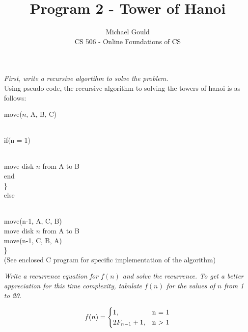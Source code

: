 \documentclass[10pt]{article}
\newcommand\tab[1][1cm]{\hspace*{#1}}
\begin{document}
\title{Program 2 - Tower of Hanoi}
\author{Michael Gould\\ 
CS 506 - Online Foundations of CS}

\maketitle
\textit{First, write a recursive algortihm to solve the problem.}\\

Using pseudo-code, the recursive algorithm to solving the towers of hanoi is as follows:

move($n$, A, B, C){\\
\tab if(n = 1){\\
\tab\tab move disk $n$ from A to B\\
\tab\tab end\\
\tab\}\\
\tab else {\\
\tab\tab move(n-1, A, C, B)\\
\tab\tab move disk $n$ from A to B\\
\tab\tab move(n-1, C, B, A)\\
\tab\}\\

(See enclosed C program for specific implementation of the algorithm)

\textit{Write a recurrence equation for $f(n)$ and solve the
recurrence. To get a better appreciation for this time complexity, tabulate $f(n)$ for the values of $n$ from 1
to 20.}

\begin{equation}
  f(n)=\begin{cases}
    1, & $n = 1$\\
    2F_{n-1} + 1, & $n $>$ 1$\\
  \end{cases}
\end{equation}

}}}
\end{document}
